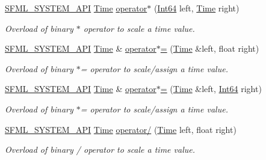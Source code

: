 \begin{DoxyCompactItemize}
\hyperlink{sfml_2dep_2_s_f_m_l-2_84_82_2include_2_s_f_m_l_2_system_2_export_8hpp_a6476c9e422606477a4c23d92b1d79a1f}{S\-F\-M\-L\-\_\-\-S\-Y\-S\-T\-E\-M\-\_\-\-A\-P\-I} \hyperlink{classsf_1_1_time}{Time} \hyperlink{classsf_1_1_time_a40a6d0938fb4a43731d54fd90bfc6476}{operator$\ast$} (\hyperlink{namespacesf_a2840579fed3494d9f330baf7a5a19903}{Int64} left, \hyperlink{classsf_1_1_time}{Time} right)
\begin{DoxyCompactList}\small\item\em Overload of binary $\ast$ operator to scale a time value. \end{DoxyCompactList}\item 
\hyperlink{sfml_2dep_2_s_f_m_l-2_84_82_2include_2_s_f_m_l_2_system_2_export_8hpp_a6476c9e422606477a4c23d92b1d79a1f}{S\-F\-M\-L\-\_\-\-S\-Y\-S\-T\-E\-M\-\_\-\-A\-P\-I} \hyperlink{classsf_1_1_time}{Time} \& \hyperlink{classsf_1_1_time_a8996b6a6fcb8f3854b486b8e43949b50}{operator$\ast$=} (\hyperlink{classsf_1_1_time}{Time} \&left, float right)
\begin{DoxyCompactList}\small\item\em Overload of binary $\ast$= operator to scale/assign a time value. \end{DoxyCompactList}\item 
\hyperlink{sfml_2dep_2_s_f_m_l-2_84_82_2include_2_s_f_m_l_2_system_2_export_8hpp_a6476c9e422606477a4c23d92b1d79a1f}{S\-F\-M\-L\-\_\-\-S\-Y\-S\-T\-E\-M\-\_\-\-A\-P\-I} \hyperlink{classsf_1_1_time}{Time} \& \hyperlink{classsf_1_1_time_a6656a0a1a1802009a72d93fbba61f24a}{operator$\ast$=} (\hyperlink{classsf_1_1_time}{Time} \&left, \hyperlink{namespacesf_a2840579fed3494d9f330baf7a5a19903}{Int64} right)
\begin{DoxyCompactList}\small\item\em Overload of binary $\ast$= operator to scale/assign a time value. \end{DoxyCompactList}\item 
\hyperlink{sfml_2dep_2_s_f_m_l-2_84_82_2include_2_s_f_m_l_2_system_2_export_8hpp_a6476c9e422606477a4c23d92b1d79a1f}{S\-F\-M\-L\-\_\-\-S\-Y\-S\-T\-E\-M\-\_\-\-A\-P\-I} \hyperlink{classsf_1_1_time}{Time} \hyperlink{classsf_1_1_time_a3386c392dbc62e51dfa59730854d1ed2}{operator/} (\hyperlink{classsf_1_1_time}{Time} left, float right)
\begin{DoxyCompactList}\small\item\em Overload of binary / operator to scale a time value. \end{DoxyCompactList}\item 

\end{DoxyCompactItemize}
